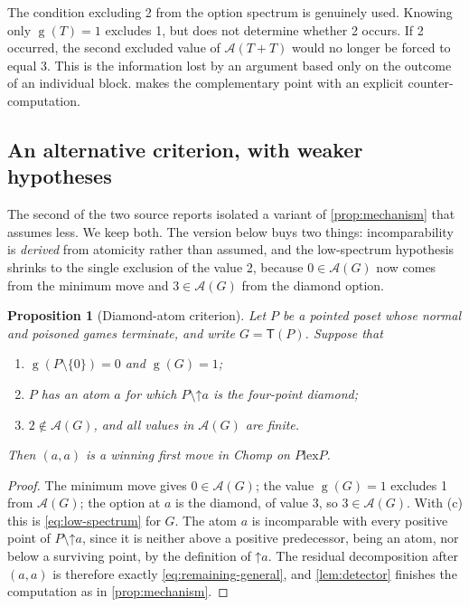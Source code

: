 \documentclass[11pt,letterpaper]{article}
\numberwithin{equation}{section}
\newtheorem{proposition}[theorem]{Proposition}
\theoremstyle{definition}
\theoremstyle{remark}
\newcommand{\sg}{\operatorname{g}}
\newcommand{\opt}{\mathcal A}
\newcommand{\Norm}{\mathsf T}
\newcommand{\up}{\mathord\uparrow}
\newcommand{\lex}{\mathbin{\mathrm{lex}}}
\begin{document}
The condition excluding 2 from the option spectrum is genuinely used.
Knowing only $\sg(T)=1$ excludes 1, but does not determine whether
2 occurs. If 2 occurred, the second excluded value of $\opt(T+T)$
would no longer be forced to equal 3. This is the information lost
by an argument based only on the outcome of an individual block.
 makes the complementary point with an explicit
counter-computation.

\subsection{An alternative criterion, with weaker hypotheses}

The second of the two source reports isolated a variant of
\cref{prop:mechanism} that assumes less. We keep both. The version below
buys two things: incomparability is \emph{derived} from atomicity rather
than assumed, and the low-spectrum hypothesis shrinks to the single
exclusion of the value 2, because $0\in\opt(G)$ now comes from the
minimum move and $3\in\opt(G)$ from the diamond option.

\begin{proposition}[Diamond-atom criterion]\label{prop:criterion}
Let $P$ be a pointed poset whose normal and poisoned games terminate, and
write $G=\Norm(P)$. Suppose that
\begin{enumerate}[label=\textup{(\alph*)},leftmargin=2.2em]
\item $\sg(P\setminus\{0\})=0$ and $\sg(G)=1$;
\item $P$ has an atom $a$ for which $P\setminus\up a$ is the four-point
      diamond;
\item $2\notin\opt(G)$, and all values in $\opt(G)$ are finite.
\end{enumerate}
Then $(a,a)$ is a winning first move in Chomp on $P\lex P$.
\end{proposition}
\begin{proof}
The minimum move gives $0\in\opt(G)$; the value $\sg(G)=1$ excludes 1
from $\opt(G)$; the option at $a$ is the diamond, of value 3, so
$3\in\opt(G)$. With (c) this is \cref{eq:low-spectrum} for $G$. The atom
$a$ is incomparable with every positive point of $P\setminus\up a$, since
it is neither above a positive predecessor, being an atom, nor below a
surviving point, by the definition of $\up a$. The residual decomposition
after $(a,a)$ is therefore exactly \cref{eq:remaining-general}, and
\cref{lem:detector} finishes the computation as in
\cref{prop:mechanism}.
\end{proof}
\end{document}
